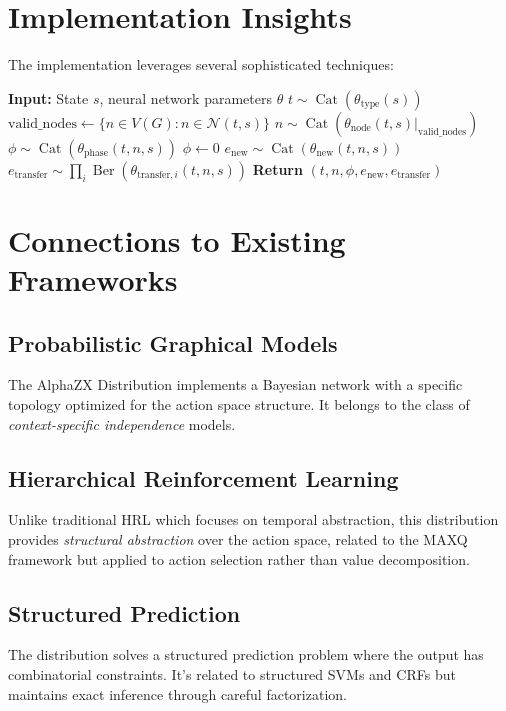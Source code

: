 \documentclass[11pt,a4paper]{article}
\DeclareMathOperator{\Cat}{Cat}
\DeclareMathOperator{\Ber}{Ber}
\newcommand{\cN}{\mathcal{N}}
\begin{document}
\section{Implementation Insights}

The implementation leverages several sophisticated techniques:

\begin{algorithm}
\caption{Sampling from AlphaZX Distribution}
\begin{algorithmic}[1]
\STATE \textbf{Input:} State $s$, neural network parameters $\theta$
\STATE $t \sim \Cat(\theta_{\text{type}}(s))$
\STATE $\text{valid\_nodes} \gets \{n \in V(G) : n \in \cN(t,s)\}$
\STATE $n \sim \Cat(\theta_{\text{node}}(t,s)|_{\text{valid\_nodes}})$
    \STATE $\phi \sim \Cat(\theta_{\text{phase}}(t,n,s))$
\ELSE
    \STATE $\phi \gets 0$
\ENDIF
\STATE $e_{\text{new}} \sim \Cat(\theta_{\text{new}}(t,n,s))$
\STATE $e_{\text{transfer}} \sim \prod_i \Ber(\theta_{\text{transfer},i}(t,n,s))$
\STATE \textbf{Return} $(t, n, \phi, e_{\text{new}}, e_{\text{transfer}})$
\end{algorithmic}
\end{algorithm}

\section{Connections to Existing Frameworks}

\subsection{Probabilistic Graphical Models}
The AlphaZX Distribution implements a Bayesian network with a specific topology optimized for the action space structure. It belongs to the class of \emph{context-specific independence} models.

\subsection{Hierarchical Reinforcement Learning}
Unlike traditional HRL which focuses on temporal abstraction, this distribution provides \emph{structural abstraction} over the action space, related to the MAXQ framework but applied to action selection rather than value decomposition.

\subsection{Structured Prediction}
The distribution solves a structured prediction problem where the output has combinatorial constraints. It's related to structured SVMs and CRFs but maintains exact inference through careful factorization.
\end{document}
